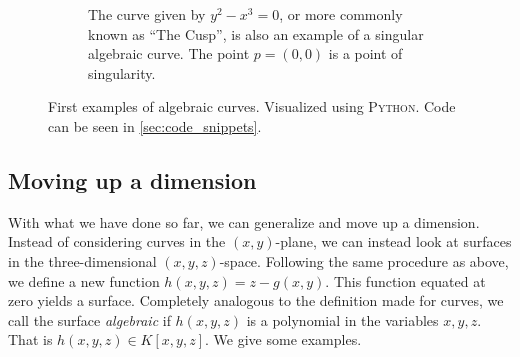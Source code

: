 \documentclass{article}
\begin{document}
\begin{figure}[h!]
\begin{subfigure}[t]{0.45\textwidth}
            \caption{The curve given by $y^2 - x^3 = 0$, or more commonly known
            as ``The Cusp'', is also an example of a singular algebraic curve.
        The point $p = (0, 0)$ is a point of singularity.}
        \end{subfigure}
        \caption{First examples of algebraic curves. Visualized using
        \textsc{Python}. Code can be seen in \cref{sec:code_snippets}.}
        \label{fig:algebraic_curves}
    \end{figure}
    
    \subsection{Moving up a dimension}
    \label{sub:moving_up_a_dimension}
    With what we have done so far, we can generalize and move up a dimension.
    Instead of considering curves in the $(x, y)$-plane, we can instead look at
    surfaces in the three-dimensional $(x, y, z)$-space. Following the same
    procedure as above, we define a new function $h(x, y, z) = z - g(x, y)$.
    This function equated at zero yields a surface.  Completely analogous to
    the definition made for curves, we call the surface \emph{algebraic} if
    $h(x, y, z)$ is a polynomial in the variables $x, y, z$. That is $h(x, y,
    z) \in K[x, y, z]$. We give some examples.
\end{document}
